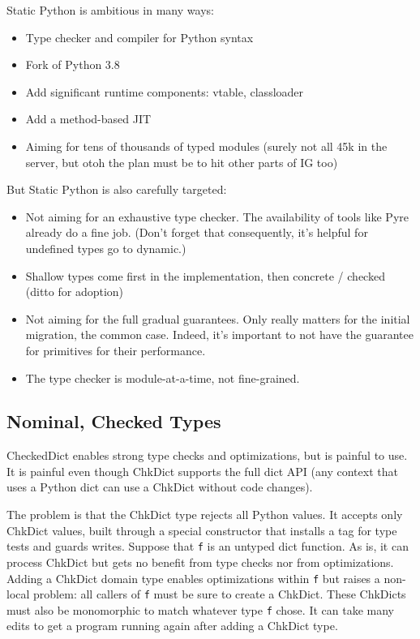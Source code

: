 \documentclass[english,cleveref,submission]{programming}
\newcommand{\SP}{Static Python}
\newcommand{\code}[1]{\texttt{#1}}
\begin{document}
\SP{} is ambitious in many ways:
\begin{itemize}
  \item Type checker and compiler for Python syntax
  \item Fork of Python 3.8
  \item Add significant runtime components: vtable, classloader
  \item Add a method-based JIT
  \item Aiming for tens of thousands of typed modules (surely not all 45k in the server, but otoh the plan must be to hit other parts of IG too)
\end{itemize}

But \SP{} is also carefully targeted:
\begin{itemize}
  \item
    Not aiming for an exhaustive type checker.
    The availability of tools like Pyre already do a fine job.
    (Don't forget that consequently, it's helpful for undefined types go to dynamic.)
  \item
    Shallow types come first in the implementation, then concrete / checked
    (ditto for adoption)
  \item
    Not aiming for the full gradual guarantees.
    Only really matters for the initial migration, the common case.
    Indeed, it's important to not have the guarantee for primitives for their performance.
  \item
    The type checker is module-at-a-time, not fine-grained.
\end{itemize}




\subsection{Nominal, Checked Types}
\label{s:concrete-migration}

CheckedDict enables strong type checks and optimizations, but is painful to use.
It is painful even though ChkDict supports the full dict API
(any context that uses a Python dict can use a ChkDict without code changes).

The problem is that the ChkDict type rejects all Python values.
It accepts only ChkDict values, built through a special constructor
that installs a tag for type tests and guards writes.
Suppose that \code{f} is an untyped dict function.
As is, it can process ChkDict but gets no benefit from type checks nor from optimizations.
Adding a ChkDict domain type enables optimizations within \code{f} but raises a non-local
problem: all callers of \code{f} must be sure to create a ChkDict.
These ChkDicts must also be monomorphic to match whatever type \code{f} chose.
It can take many edits to get a program running again after adding a ChkDict type.
\end{document}
